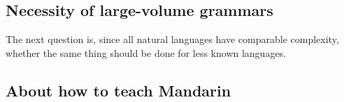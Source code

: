 \documentclass[UTF8, a4paper, oneside, scheme=plain]{ctexrep}
\begin{document}
\subsection{Necessity of large-volume grammars}

The next question is, 
since all natural languages have comparable complexity, 
whether the same thing should be done for less known languages.

\subsection{About how to teach Mandarin}

\printbibliography[title=References]
\end{document}
